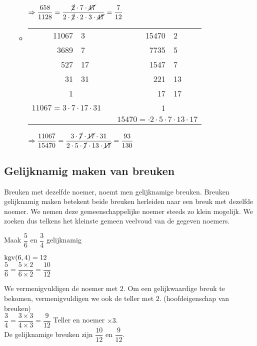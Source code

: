\documentclass[12pt]{article}
\begin{document}
\begin{solution}
\begin{enumerate}[(a)]
\begin{itemize}
    $\Rightarrow \dfrac{658}{1128}=\dfrac{\cancel{2}\cdot 7\cdot \cancel{47}}{2\cdot \cancel{2}\cdot 2\cdot 3\cdot \cancel{47}}=\dfrac{7}{12}$\\
    \item
    \begin{tabular}[t]{r|lp{2cm}r|l}
    11067 & 3  & & 15470 &  2\\
     3689 & 7  & &  7735 &  5\\
      527 & 17 & &  1547 &  7\\
       31 & 31 & &   221 & 13\\
        1 &    & &    17 & 17\\
    \multicolumn{2}{c}{$11067=3\cdot7\cdot17\cdot31$}& &   1 & \\
    \multicolumn{2}{c}{}
    &&\multicolumn{2}{c}{$15470=\cdot2\cdot5\cdot7\cdot13\cdot17$}
    \end{tabular}
    
    $\Rightarrow \dfrac{11067}{15470}=\dfrac{3\cdot\cancel{7}\cdot \cancel{17}\cdot 31}{2\cdot 5\cdot \cancel{7}\cdot 13\cdot \cancel{17}}=\dfrac{93}{130}$\\
    
    \end{itemize}
\end{enumerate}
\end{solution}

\subsection{Gelijknamig maken van breuken}

Breuken met dezelfde noemer, noemt men gelijknamige breuken.
Breuken gelijknamig maken betekent beide breuken herleiden naar een breuk met dezelfde noemer.
We nemen deze gemeenschappelijke noemer steeds zo klein mogelijk.
We zoeken dus telkens het kleinste gemeen veelvoud van de gegeven noemers.


\begin{voorbeeld}
Maak $\dfrac{5}{6}$ en $\dfrac{3}{4}$ gelijknamig

$\kgv(6,4)=12$\\

$\dfrac{5}{6}= \dfrac{5\times 2}{6\times 2}=\dfrac{10}{12}$

We vermenigvuldigen de noemer met $2$. Om een gelijkwaardige breuk te bekomen, vermenigvuldigen we ook de teller met $2$. (hoofdeigenschap van breuken)\\

$\dfrac{3}{4}= \dfrac{3\times 3}{4\times 3}=\dfrac{9}{12}$ \qquad Teller en noemer $\times 3$.\\

De gelijknamige breuken zijn $\dfrac{10}{12}$ en $\dfrac{9}{12}$.
\end{voorbeeld}
\end{document}
